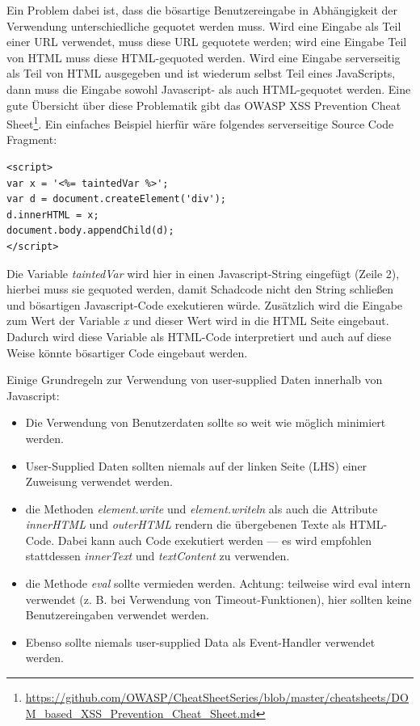 Ein Problem dabei ist, dass die bösartige Benutzereingabe in Abhängigkeit der Verwendung unterschiedliche gequotet werden muss. Wird eine Eingabe als Teil einer URL verwendet, muss diese URL gequotete werden; wird eine Eingabe Teil von HTML muss diese HTML-gequoted werden. Wird eine Eingabe serverseitig als Teil von HTML ausgegeben und ist wiederum selbst Teil eines JavaScripts, dann muss die Eingabe sowohl Javascript- als auch HTML-gequotet werden. Eine gute Übersicht über diese Problematik gibt das OWASP XSS Prevention Cheat Sheet\footnote{\url{https://github.com/OWASP/CheatSheetSeries/blob/master/cheatsheets/DOM_based_XSS_Prevention_Cheat_Sheet.md}}. Ein einfaches Beispiel hierfür wäre folgendes serverseitige Source Code Fragment:

\begin{verbatim}
<script>
var x = '<%= taintedVar %>';
var d = document.createElement('div');
d.innerHTML = x;
document.body.appendChild(d);
</script>
\end{verbatim}

Die Variable \textit{taintedVar} wird hier in einen Javascript-String eingefügt (Zeile 2), hierbei muss sie gequoted werden, damit Schadcode nicht den String schließen und bösartigen Javascript-Code exekutieren würde. Zusätzlich wird die Eingabe zum Wert der Variable \textit{x} und dieser Wert wird in die HTML Seite eingebaut. Dadurch wird diese Variable als HTML-Code interpretiert und auch auf diese Weise könnte bösartiger Code eingebaut werden.

Einige Grundregeln zur Verwendung von user-supplied Daten innerhalb von Javascript:

\begin{itemize}
\item Die Verwendung von Benutzerdaten sollte so weit wie möglich minimiert werden.
\item User-Supplied Daten sollten niemals auf der linken Seite (LHS) einer Zuweisung verwendet werden.
\item die Methoden \textit{element.write} und \textit{element.writeln} als auch die Attribute \textit{innerHTML} und \textit{outerHTML} rendern die übergebenen Texte als HTML-Code. Dabei kann auch Code exekutiert werden --- es wird empfohlen stattdessen \textit{innerText} und \textit{textContent} zu verwenden.
\item die Methode \textit{eval} sollte vermieden werden. Achtung: teilweise wird eval intern verwendet (z. B. bei Verwendung von Timeout-Funktionen), hier sollten keine Benutzereingaben verwendet werden.
\item Ebenso sollte niemals user-supplied Data als Event-Handler verwendet werden.
\end{itemize}

